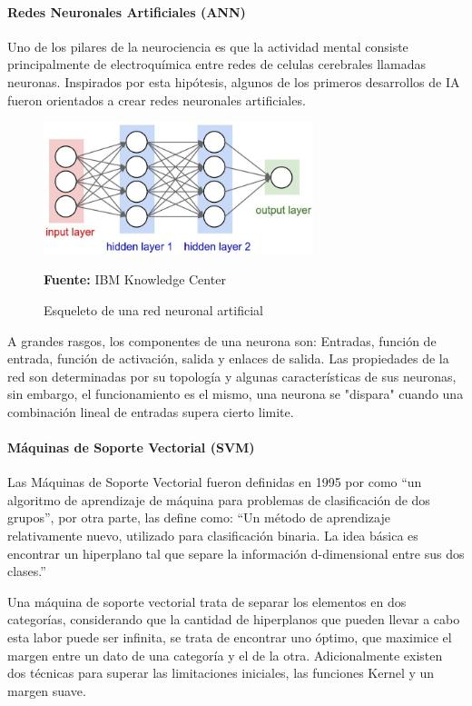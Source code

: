 \paragraph{Redes Neuronales Artificiales (ANN)}
Uno de los pilares de la neurociencia es que la actividad mental consiste principalmente de electroquímica entre redes de celulas cerebrales llamadas neuronas. Inspirados por esta hipótesis, algunos de los primeros desarrollos de IA fueron orientados a crear redes neuronales artificiales.  \parencite[727]{Russel2010Artificial_Intelligence_3rd}

\begin{figure}[H]
    \centering
    \includegraphics[width=0.7\textwidth]{Anexos/LATEX/chapters/images/ann.jpg}
    \caption{Esqueleto de una red neuronal artificial}
    \small{\textbf{Fuente:} IBM Knowledge Center}
    \label{ann}
\end{figure}

A grandes rasgos, los componentes de una neurona son: Entradas, función de entrada, función de activación, salida y enlaces de salida. Las propiedades de la red son determinadas por su topología y algunas características de sus neuronas, sin embargo, el funcionamiento es el mismo, una neurona se "dispara" cuando una combinación lineal de entradas supera cierto limite.

\paragraph{Máquinas de Soporte Vectorial (SVM)}
Las Máquinas de Soporte Vectorial fueron definidas en 1995 por \parencite{Cortes1995Support-VectorNetworks} como “un algoritmo de aprendizaje de máquina para problemas de clasificación de dos grupos”, por otra parte, \parencite{Boswell2002IntroductionMachines} las define como: “Un método de aprendizaje relativamente nuevo, utilizado para clasificación binaria. La idea básica es encontrar un hiperplano tal que separe la información d-dimensional entre sus dos clases.”

Una máquina de soporte vectorial trata de separar los elementos en dos categorías, considerando que la cantidad de hiperplanos que pueden llevar a cabo esta labor puede ser infinita, se trata de encontrar uno óptimo, que maximice el margen entre un dato de una categoría y el de la otra. Adicionalmente existen dos técnicas para superar las limitaciones iniciales, las funciones Kernel y un margen suave.

